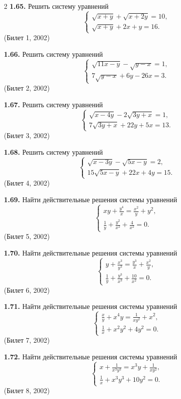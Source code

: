 \documentclass[14pt,a4paper,landscape]{extarticle}
\begin{document}
\begin{multicols}{2}
\textbf{1.65.} Решить систему уравнений
\[
\begin{cases}
\sqrt{x + y} + \sqrt{x + 2y} = 10, \\
\sqrt{x + y} + 2x + y = 16.
\end{cases}
\]
\hfill \textnormal{(Билет 1, 2002)}

\textbf{1.66.} Решить систему уравнений
\[
\begin{cases}
\sqrt{11x - y} - \sqrt{y - x} = 1, \\
7\sqrt{y - x} + 6y - 26x = 3.
\end{cases}
\]
\hfill \textnormal{(Билет 2, 2002)}

\textbf{1.67.} Решить систему уравнений
\[
\begin{cases}
\sqrt{x - 4y} - 2\sqrt{3y + x} = 1, \\
7\sqrt{3y + x} + 22y + 5x = 13.
\end{cases}
\]
\hfill \textnormal{(Билет 3, 2002)}

\textbf{1.68.} Решить систему уравнений
\[
\begin{cases}
\sqrt{x - 3y} - \sqrt{5x - y} = 2, \\
15\sqrt{5x - y} + 22x + 4y = 15.
\end{cases}
\]
\hfill \textnormal{(Билет 4, 2002)}

\textbf{1.69.} Найти действительные решения системы уравнений
\[
\begin{cases}
xy + \frac{y^4}{x} = \frac{x^2}{y} + y^2, \\[1ex]
\frac{1}{y} + \frac{y^2}{x^2} + \frac{4}{x^2} = 0.
\end{cases}
\]
\hfill \textnormal{(Билет 5, 2002)}

\textbf{1.70.} Найти действительные решения системы уравнений
\[
\begin{cases}
y + \frac{x^3}{y^3} = \frac{y^3}{x} + \frac{x^2}{y}, \\[1ex]
\frac{1}{y} + \frac{y^3}{x^3} + \frac{10}{x^2} = 0.
\end{cases}
\]
\hfill \textnormal{(Билет 6, 2002)}

\textbf{1.71.} Найти действительные решения системы уравнений
\[
\begin{cases}
\frac{x}{y} + x^4y = \frac{1}{xy^2} + x^2, \\[1ex]
\frac{1}{x} + x^2y^2 + 4y^2 = 0.
\end{cases}
\]
\hfill \textnormal{(Билет 7, 2002)}

\textbf{1.72.} Найти действительные решения системы уравнений
\[
\begin{cases}
x + \frac{1}{x^3y^3} = x^3y + \frac{1}{xy^2}, \\[1ex]
\frac{1}{x} + x^3y^3 + 10y^2 = 0.
\end{cases}
\]
\hfill \textnormal{(Билет 8, 2002)}


\end{multicols}
\end{document}
